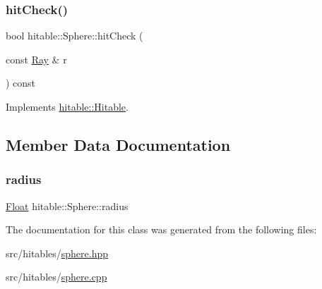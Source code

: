 \subsubsection{\texorpdfstring{hitCheck()}{hitCheck()}}
{\footnotesize\ttfamily bool hitable\+::\+Sphere\+::hit\+Check (\begin{DoxyParamCaption}\item[{const \mbox{\hyperlink{classRay}{Ray}} \&}]{r }\end{DoxyParamCaption}) const\hspace{0.3cm}{\ttfamily [virtual]}}



Implements \mbox{\hyperlink{classhitable_1_1Hitable_a749b7d827cd624ab6eacc1ab93a53e64}{hitable\+::\+Hitable}}.



\subsection{Member Data Documentation}
\mbox{\label{classhitable_1_1Sphere_a8c048f1afbbf72c97de9949e43c23ebb}} 
\subsubsection{\texorpdfstring{radius}{radius}}
{\footnotesize\ttfamily \mbox{\hyperlink{cyclop_8hpp_a07afd7094cb489cbd514c76e6f55d34f}{Float}} hitable\+::\+Sphere\+::radius}



The documentation for this class was generated from the following files\+:\begin{DoxyCompactItemize}
\item 
src/hitables/\mbox{\hyperlink{sphere_8hpp}{sphere.\+hpp}}\item 
src/hitables/\mbox{\hyperlink{sphere_8cpp}{sphere.\+cpp}}\end{DoxyCompactItemize}
